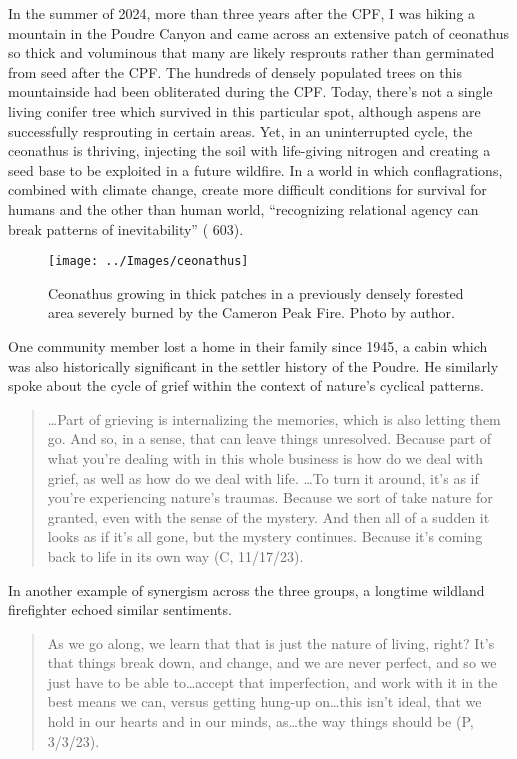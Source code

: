 \documentclass[
]{article}
\begin{document}
In the summer of 2024, more than three years after the CPF, I was hiking a mountain in the Poudre Canyon and came across an extensive patch of ceonathus so thick and voluminous that many are likely resprouts rather than germinated from seed after the CPF. The hundreds of densely populated trees on this mountainside had been obliterated during the CPF. Today, there's not a single living conifer tree which survived in this particular spot, although aspens are successfully resprouting in certain areas. Yet, in an uninterrupted cycle, the ceonathus is thriving, injecting the soil with life-giving nitrogen and creating a seed base to be exploited in a future wildfire. In a world in which conflagrations, combined with climate change, create more difficult conditions for survival for humans and the other than human world, ``recognizing relational agency can break patterns of inevitability'' ( 603).

\begin{figure}
\texttt{[image: ../Images/ceonathus]} \caption[Ceonathus]{Ceonathus growing in thick patches in a previously densely forested area severely burned by the Cameron Peak Fire. Photo by author.}\label{fig:figureTitle16}
\end{figure}

One community member lost a home in their family since 1945, a cabin which was also historically significant in the settler history of the Poudre. He similarly spoke about the cycle of grief within the context of nature's cyclical patterns.

\begin{quote}
\ldots Part of grieving is internalizing the memories, which is also letting them go. And so, in a sense, that can leave things unresolved. Because part of what you're dealing with in this whole business is how do we deal with grief, as well as how do we deal with life. \ldots To turn it around, it's as if you're experiencing nature's traumas. Because we sort of take nature for granted, even with the sense of the mystery. And then all of a sudden it looks as if it's all gone, but the mystery continues. Because it's coming back to life in its own way (C, 11/17/23).
\end{quote}

In another example of synergism across the three groups, a longtime wildland firefighter echoed similar sentiments.

\begin{quote}
As we go along, we learn that that is just the nature of living, right? It's that things break down, and change, and we are never perfect, and so we just have to be able to\ldots accept that imperfection, and work with it in the best means we can, versus getting hung-up on\ldots this isn't ideal, that we hold in our hearts and in our minds, as\ldots the way things should be (P, 3/3/23).
\end{quote}
\end{document}
